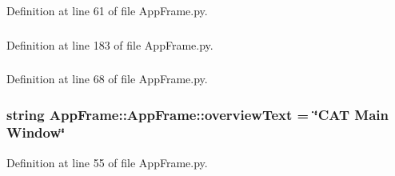 Definition at line 61 of file AppFrame.py.\hypertarget{classAppFrame_1_1AppFrame_a9cbeda3bc1a78e934f1aebcd2c85e403}{
\subsubsection[{menuBar}]{}}
\label{classAppFrame_1_1AppFrame_a9cbeda3bc1a78e934f1aebcd2c85e403}


Definition at line 183 of file AppFrame.py.\hypertarget{classAppFrame_1_1AppFrame_a7b899e2a2d3601a640bde2ba4a4c09b6}{
\subsubsection[{objs}]{}}
\label{classAppFrame_1_1AppFrame_a7b899e2a2d3601a640bde2ba4a4c09b6}


Definition at line 68 of file AppFrame.py.\hypertarget{classAppFrame_1_1AppFrame_a667d35fae1ebfa2706cfbb31fdf0cbab}{
\subsubsection[{overviewText}]{\setlength{\rightskip}{0pt plus 5cm}string {\bf AppFrame::AppFrame::overviewText} = \char`\"{}CAT Main Window\char`\"{}}}
\label{classAppFrame_1_1AppFrame_a667d35fae1ebfa2706cfbb31fdf0cbab}


Definition at line 55 of file AppFrame.py.\hypertarget{classAppFrame_1_1AppFrame_a814271a025b2beadb1187e3e9673b0fd}{
\subsubsection[{panel}]{}}
\label{classAppFrame_1_1AppFrame_a814271a025b2beadb1187e3e9673b0fd}


